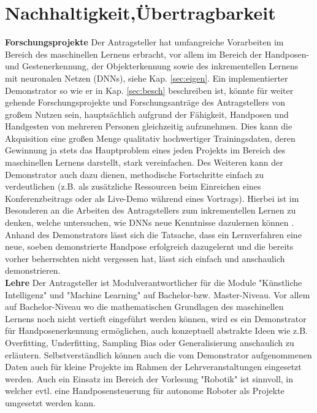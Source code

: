 \documentclass[11pt]{article}
\begin{document}
\section{Nachhaltigkeit,Übertragbarkeit}\label{sec:ueber}
\textbf {Forschungsprojekte} Der Antragsteller hat umfangreiche Vorarbeiten im Bereich des maschinellen Lernens erbracht, vor allem im Bereich der Handposen- und Gesten\-er\-kenn\-ung, der Objekterkennung sowie des inkrementellen Lernens mit neuronalen Netzen (DNNs), siehe Kap. \ref{sec:eigen}.
Ein implementierter Demonstrator so wie er in Kap. \ref{sec:besch} beschreiben ist, könnte für weiter gehende Forschungsprojekte und Forschungsanträge des Antragstellers von großem Nutzen sein, hauptsächlich aufgrund der Fähigkeit, Hand\-posen und Hand\-gesten von mehreren Personen gleichzeitig aufzunehmen. Dies kann die Akquisition eine großen Menge qualitativ hochwertiger Trainingsdaten, deren Gewinnung ja stets das Hauptproblem eines jeden Projekts im Bereich des maschinellen Lernens darstellt, stark vereinfachen. Des Weiteren kann der Demonstrator auch dazu dienen, methodische Fortschritte einfach zu verdeutlichen (z.B. als zusätzliche Ressourcen beim Einreichen eines Konferenzbeitrags oder als Live-Demo während eines Vortrags). Hierbei ist im Besonderen an die Arbeiten des Antragstellers zum inkrementellen Lernen zu denken, welche untersuchen, wie DNNs neue Kenntnisse dazulernen können \cite{gepperth2017b,gepperth2018a,gepperth2016tut,gepperth2015bio}. Anhand des Demonstrators lässt sich die Tatsache, dass ein Lernverfahren eine neue, soeben demonstrierte Handpose erfolgreich dazugelernt und die bereits vorher beherrschten nicht vergessen hat, lässt sich einfach und anschaulich demonstrieren.\\

\textbf{Lehre}
Der Antragsteller ist Modulverantwortlicher für die Module "Künstliche Intelligenz" und "Machine Learning" auf Bachelor-bzw. Master-Niveau. Vor allem auf Bachelor-Niveau wo die mathematischen Grundlagen des maschinellen Lernens noch nicht vertieft eingeführt werden können, wird es ein Demonstrator für Handposenerkennung ermöglichen, auch konzeptuell abstrakte Ideen wie z.B. Overfitting, Underfitting, Sampling Bias oder Generalisierung anschaulich zu erläutern. Selbstverständlich können auch die vom Demonstrator aufgenommenen Daten auch für kleine Projekte im Rahmen der Lehrveranstaltungen eingesetzt werden. Auch ein Einsatz im Bereich der Vorlesung "Robotik" ist sinnvoll, in welcher evtl. eine Handposensteuerung für autonome Roboter als Projekte umgesetzt werden kann.\\
\end{document}
